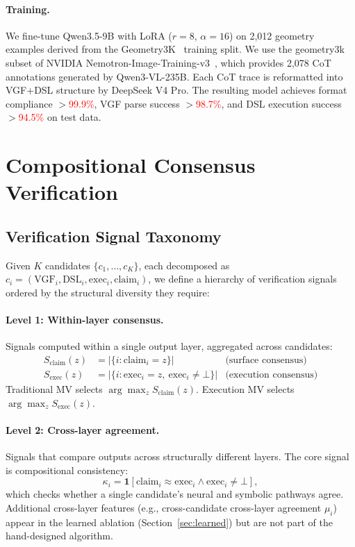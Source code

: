 \documentclass{article}
\newcommand{\recheck}[1]{\textcolor{red}{#1}}
\begin{document}
\paragraph{Training.}
We fine-tune Qwen3.5-9B with LoRA ($r{=}8$, $\alpha{=}16$) on 2,012 geometry examples derived from the Geometry3K~\citep{lu2021inter} training split. We use the geometry3k subset of NVIDIA Nemotron-Image-Training-v3~\citep{blakeman2025nvidia}, which provides 2,078 CoT annotations generated by Qwen3-VL-235B. Each CoT trace is reformatted into VGF+DSL structure by DeepSeek V4 Pro. The resulting model achieves format compliance $>$\recheck{99.9\%}, VGF parse success $>$\recheck{98.7\%}, and DSL execution success $>$\recheck{94.5\%} on test data.

\section{Compositional Consensus Verification}
\label{sec:method}

\subsection{Verification Signal Taxonomy}
\label{sec:signals}

Given $K$ candidates $\{c_1, \ldots, c_K\}$, each decomposed as $c_i = (\text{VGF}_i, \text{DSL}_i, \text{exec}_i, \text{claim}_i)$, we define a hierarchy of verification signals ordered by the structural diversity they require:

\paragraph{Level 1: Within-layer consensus.} Signals computed within a single output layer, aggregated across candidates:
\begin{align}
    S_{\text{claim}}(z) &= |\{i : \text{claim}_i = z\}| & \text{(surface consensus)} \\
    S_{\text{exec}}(z) &= |\{i : \text{exec}_i = z,\ \text{exec}_i \neq \bot\}| & \text{(execution consensus)}
\end{align}
Traditional MV selects $\arg\max_z S_{\text{claim}}(z)$. Execution MV selects $\arg\max_z S_{\text{exec}}(z)$.

\paragraph{Level 2: Cross-layer agreement.} Signals that compare outputs across structurally different layers. The core signal is compositional consistency:
\begin{equation}
    \kappa_i = \mathbf{1}[\text{claim}_i \approx \text{exec}_i \wedge \text{exec}_i \neq \bot],
\end{equation}
which checks whether a single candidate's neural and symbolic pathways agree. Additional cross-layer features (e.g., cross-candidate cross-layer agreement $\mu_i$) appear in the learned ablation (Section~\ref{sec:learned}) but are not part of the hand-designed algorithm.
\end{document}
